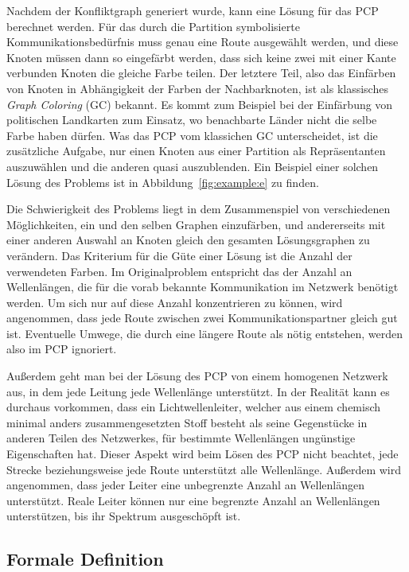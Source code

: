 Nachdem der Konfliktgraph generiert wurde, kann eine Lösung für das PCP berechnet werden. Für das durch die Partition symbolisierte Kommunikationsbedürfnis muss genau eine Route ausgewählt werden, und diese Knoten müssen dann so eingefärbt werden, dass sich keine zwei mit einer Kante verbunden Knoten die gleiche Farbe teilen. Der letztere Teil, also das Einfärben von Knoten in Abhängigkeit der Farben der Nachbarknoten, ist als klassisches \textit{Graph Coloring} (GC) bekannt. Es kommt zum Beispiel bei der Einfärbung von politischen Landkarten zum Einsatz, wo benachbarte Länder nicht die selbe Farbe haben dürfen. Was das PCP vom klassichen GC unterscheidet, ist die zusätzliche Aufgabe, nur einen Knoten aus einer Partition als Repräsentanten auszuwählen und die anderen quasi auszublenden. Ein Beispiel einer solchen Lösung des Problems ist in Abbildung~\ref{fig:example:e} zu finden.

Die Schwierigkeit des Problems liegt in dem Zusammenspiel von verschiedenen Möglichkeiten, ein und den selben Graphen einzufärben, und andererseits mit einer anderen Auswahl an Knoten gleich den gesamten Lösungsgraphen zu verändern. Das Kriterium für die Güte einer Lösung ist die Anzahl der verwendeten Farben. Im Originalproblem entspricht das der Anzahl an Wellenlängen, die für die vorab bekannte Kommunikation im Netzwerk benötigt werden. Um sich nur auf diese Anzahl konzentrieren zu können, wird angenommen, dass jede Route zwischen zwei Kommunikationspartner gleich gut ist. Eventuelle Umwege, die durch eine längere Route als nötig entstehen, werden also im PCP ignoriert. 

Außerdem geht man bei der Lösung des PCP von einem homogenen Netzwerk aus, in dem jede Leitung jede Wellenlänge unterstützt. In der Realität kann es durchaus vorkommen, dass ein Lichtwellenleiter, welcher aus einem chemisch minimal anders zusammengesetzten Stoff besteht als seine Gegenstücke in anderen Teilen des Netzwerkes, für bestimmte Wellenlängen ungünstige Eigenschaften hat. Dieser Aspekt wird beim Lösen des PCP nicht beachtet, jede Strecke beziehungsweise jede Route unterstützt alle Wellenlänge. Außerdem wird angenommen, dass jeder Leiter eine unbegrenzte Anzahl an Wellenlängen unterstützt. Reale Leiter können nur eine begrenzte Anzahl an Wellenlängen unterstützen, bis ihr Spektrum ausgeschöpft ist.

\subsection{Formale Definition}

